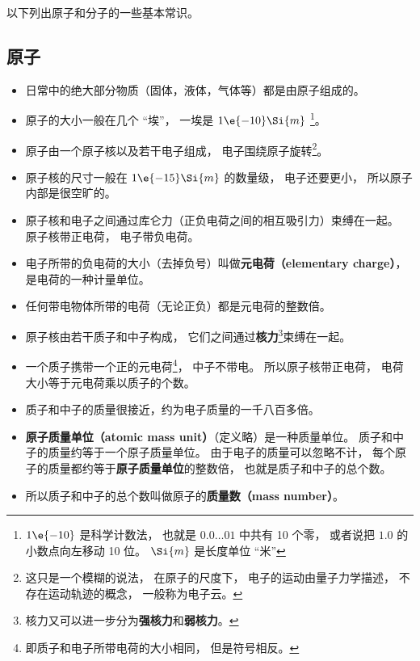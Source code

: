 
\begin{issues}
\issueDraft
\end{issues}


以下列出原子和分子的一些基本常识。

\subsection{原子}
\begin{itemize}
\item 日常中的绝大部分物质（固体，液体，气体等）都是由原子组成的。
\item 原子的大小一般在几个 “埃”， 一埃是 $1\e{-10}\Si{m}$ \footnote{$1\e{-10}$ 是科学计数法， 也就是 $0.0\dots01$ 中共有 10 个零， 或者说把 $1.0$ 的小数点向左移动 10 位。 $\Si{m}$ 是长度单位 “米”}。 %
\item 原子由一个原子核以及若干电子组成， 电子围绕原子旋转\footnote{这只是一个模糊的说法， 在原子的尺度下， 电子的运动由量子力学描述， 不存在运动轨迹的概念， 一般称为电子云。}。
\item 原子核的尺寸一般在 $1\e{-15}\Si{m}$ 的数量级， 电子还要更小， 所以原子内部是很空旷的。
\item 原子核和电子之间通过库仑力（正负电荷之间的相互吸引力）束缚在一起。 原子核带正电荷， 电子带负电荷。 %
\item 电子所带的负电荷的大小（去掉负号）叫做\textbf{元电荷（elementary charge）}， 是电荷的一种计量单位。 \item 任何带电物体所带的电荷（无论正负）都是元电荷的整数倍。
\item 原子核由若干质子和中子构成， 它们之间通过\textbf{核力}\footnote{核力又可以进一步分为\textbf{强核力}和\textbf{弱核力}。}束缚在一起。
\item 一个质子携带一个正的元电荷\footnote{即质子和电子所带电荷的大小相同， 但是符号相反。}， 中子不带电。 所以原子核带正电荷， 电荷大小等于元电荷乘以质子的个数。
\item 质子和中子的质量很接近，约为电子质量的一千八百多倍。
\item \textbf{原子质量单位（atomic mass unit）}（定义略）是一种质量单位。 质子和中子的质量约等于一个原子质量单位。 由于电子的质量可以忽略不计， 每个原子的质量都约等于\textbf{原子质量单位}的整数倍， 也就是质子和中子的总个数。
\item 所以质子和中子的总个数叫做原子的\textbf{质量数（mass number）}。

\end{itemize}
